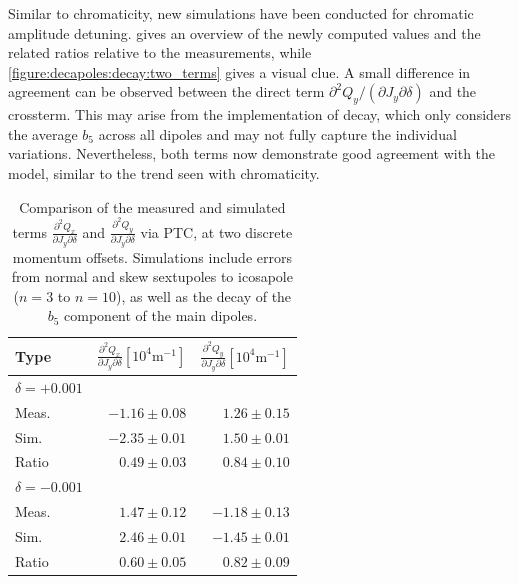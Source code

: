 Similar to chromaticity, new simulations have been conducted for chromatic amplitude detuning.
 gives an overview of the newly computed values and 
the related ratios relative to the measurements, while \cref{figure:decapoles:decay:two_terms} gives
a visual clue.
A small difference in agreement can be observed between the direct term $\partial^2 Q_y / (\partial
J_y \partial \delta)$ and the crossterm. This may arise from the implementation of decay, which only
considers the average $b_5$ across all dipoles and may not fully capture the individual variations.
Nevertheless, both terms now demonstrate good agreement with the model, similar to the trend seen
with chromaticity.


\begin{table}[H]
  \centering
  \begin{tabular}{lrr}
  \toprule
   Type  & $\frac{\partial^2 Q_x}{\partial J_y \partial \delta}[10^{4}\mathrm{m}^{-1}]$ & $\frac{\partial^2 Q_y}{\partial J_y \partial \delta}[10^{4}\mathrm{m}^{-1}]$ \\
  \midrule
  $\delta = +0.001$ & & \\
  \hspace{2mm}Meas.  &   $-1.16 \pm 0.08$ &  $1.26 \pm 0.15$  \\
  \hspace{2mm}Sim.   &   $-2.35 \pm 0.01$ &  $1.50 \pm 0.01$  \\
  \hspace{2mm}Ratio  &   $ 0.49 \pm 0.03$ &  $0.84 \pm 0.10$  \\
  $\delta = -0.001$ & & \\
  \hspace{2mm}Meas.  &  $1.47 \pm 0.12$  &   $-1.18 \pm 0.13$ \\
  \hspace{2mm}Sim.   &  $2.46 \pm 0.01$  &   $-1.45 \pm 0.01$ \\
  \hspace{2mm}Ratio  &  $0.60 \pm 0.05$  &   $ 0.82 \pm 0.09$ \\
  \bottomrule
  \end{tabular}
  \caption{Comparison of the measured and simulated terms $\frac{\partial^2 Q_x}{\partial J_y
  \partial \delta}$ and $\frac{\partial^2 Q_y}{\partial J_y \partial \delta}$ via PTC, at two
  discrete momentum offsets. Simulations include errors from normal and skew sextupoles to 
  icosapole ($n=3$ to $n=10$), as well as the decay of the $b_5$ component of the main dipoles.}
  \label{table:decapoles:decay:chromatic_ampdet}
\end{table}

